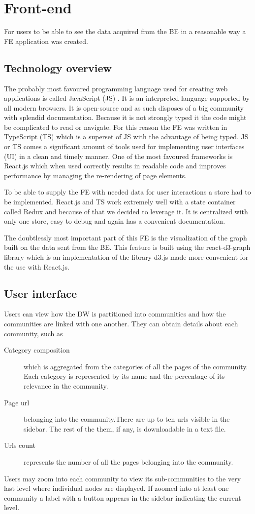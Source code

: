 \section{Front-end}
For users to be able to see the data acquired from the BE in a reasonable way a FE application was created. 
\subsection{Technology overview}
The probably most favoured programming language used for creating web applications \cite{jsGithut} is called JavaScript (JS) \cite{javaScript}. It is an interpreted language supported by all modern browsers. It is open-source and as such disposes of a big community with splendid documentation. Because it is not strongly typed it the code might be complicated to read or navigate. For this reason the FE was written in TypeScript (TS) \cite{typeScript} which is a superset of JS with the advantage of being typed. JS or TS comes a significant amount of tools used for implementing user interfaces (UI) in a clean and timely manner. One of the most favoured frameworks is React.js \cite{react} which when used correctly results in readable code and improves performance by managing the re-rendering of page elements.


To be able to supply the FE with needed data for user interactions a store had to be implemented. React.js and TS work extremely well with a state container called Redux \cite{redux} and because of that we decided to leverage it. It is centralized with only one store, easy to debug and again has a convenient documentation. 

The doubtlessly most important part of this FE is the visualization of the graph built on the data sent from the BE. This feature is built using the react-d3-graph library \cite{reactD3Graph} which is 
an implementation of the library d3.js \cite{d3} made more convenient for the use with React.js. 

\subsection{User interface}
Users can view how the DW is partitioned into communities and how the communities are linked with one another. They can obtain details about each community, such as
\begin {description}
	\item [Category composition] which is aggregated from the categories of all the pages of the community. Each category is represented by its name and the percentage of its relevance in the community.
	\item [Page url] belonging into the community.There are up to ten urls visible in the sidebar. The rest of the them, if any, is downloadable in a text file. 
	\item[Urls count]represents the number of all the pages belonging into the community. 
\end{description}
Users may zoom into each community to view its sub-communities to the very last level where individual nodes are displayed. If zoomed into at least one community a label with a button appears in the sidebar indicating the current level. 


